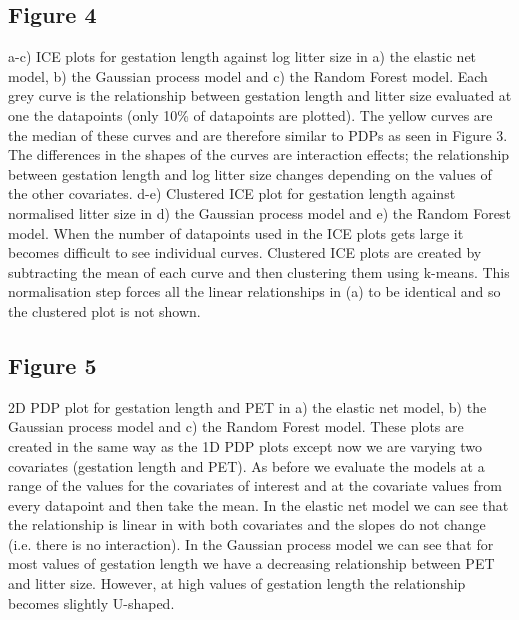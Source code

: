 \documentclass[12pt]{article}
\begin{document}
\subsection{Figure 4}
    a-c) ICE plots for gestation length against log litter size in a) the elastic net model, b) the Gaussian process model and c) the Random Forest model.
    Each grey curve is the relationship between gestation length and litter size evaluated at one the datapoints (only 10\% of datapoints are plotted). 
    The yellow curves are the median of these curves and are therefore similar to PDPs as seen in Figure 3.
    The differences in the shapes of the curves are interaction effects; the relationship between gestation length and log litter size changes depending on the values of the other covariates.
    d-e) Clustered ICE plot for gestation length against normalised litter size in d) the Gaussian process model and e) the Random Forest model.
    When the number of datapoints used in the ICE plots gets large it becomes difficult to see individual curves.
    Clustered ICE plots are created by subtracting the mean of each curve and then clustering them using k-means.
    This normalisation step forces all the linear relationships in (a) to be identical and so the clustered plot is not shown. 


\subsection{Figure 5}
    2D PDP plot for gestation length and PET in a) the elastic net model, b) the Gaussian process model and c) the Random Forest model.
    These plots are created in the same way as the 1D PDP plots except now we are varying two covariates (gestation length and PET).
    As before we evaluate the models at a range of the values for the covariates of interest and at the covariate values from every datapoint and then take the mean.
    In the elastic net model we can see that the relationship is linear in with both covariates and the slopes do not change (i.e. there is no interaction).
    In the Gaussian process model we can see that for most values of gestation length we have a decreasing relationship between PET and litter size.
    However, at high values of gestation length the relationship becomes slightly U-shaped.
\end{document}
